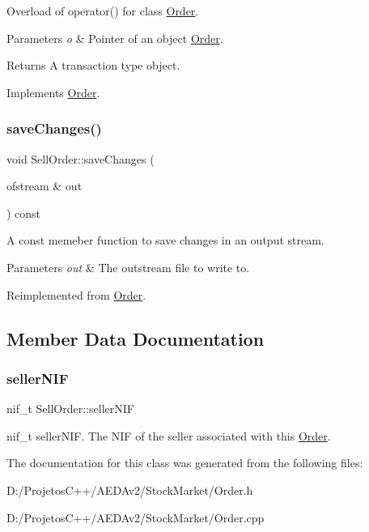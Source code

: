 Overload of operator() for class \hyperlink{class_order}{Order}. 
\begin{DoxyParams}{Parameters}
{\em o} & Pointer of an object \hyperlink{class_order}{Order}. \\
\hline
\end{DoxyParams}
\begin{DoxyReturn}{Returns}
A transaction type object. 
\end{DoxyReturn}


Implements \hyperlink{class_order_a85d5de18c8664085619e3a5c74d47a25}{Order}.

\mbox{\label{class_sell_order_a81c6ea39652c38a718803c036767787f}} 
\subsubsection{\texorpdfstring{save\+Changes()}{saveChanges()}}
{\footnotesize\ttfamily void Sell\+Order\+::save\+Changes (\begin{DoxyParamCaption}\item[{ofstream \&}]{out }\end{DoxyParamCaption}) const\hspace{0.3cm}{\ttfamily [virtual]}}

A const memeber function to save changes in an output stream. 
\begin{DoxyParams}{Parameters}
{\em out} & The outstream file to write to. \\
\hline
\end{DoxyParams}


Reimplemented from \hyperlink{class_order_a83989bde0a9b40cbeb0e87c965f6096e}{Order}.



\subsection{Member Data Documentation}
\mbox{\label{class_sell_order_a986130b91a0dc2f234dffc10b24c3183}} 
\subsubsection{\texorpdfstring{seller\+N\+IF}{sellerNIF}}
{\footnotesize\ttfamily nif\+\_\+t Sell\+Order\+::seller\+N\+IF\hspace{0.3cm}{\ttfamily [private]}}

nif\+\_\+t seller\+N\+IF. The N\+IF of the seller associated with this \hyperlink{class_order}{Order}. 

The documentation for this class was generated from the following files\+:\begin{DoxyCompactItemize}
\item 
D\+:/\+Projetos\+C++/\+A\+E\+D\+Av2/\+Stock\+Market/Order.\+h\item 
D\+:/\+Projetos\+C++/\+A\+E\+D\+Av2/\+Stock\+Market/Order.\+cpp\end{DoxyCompactItemize}
